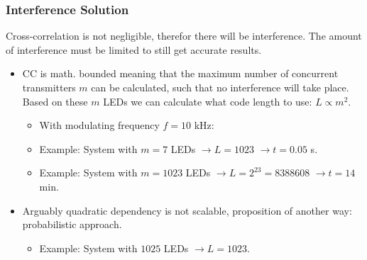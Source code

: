 \documentclass{beamer}
\begin{document}
	\begin{frame}\frametitle{Interference Solution}

		Cross-correlation is not negligible, therefor there will be interference. The amount of interference must be limited to still get accurate results.

		\begin{itemize}

			\item CC is math. bounded meaning that the maximum number of concurrent transmitters $m$ can be calculated, such that no interference will take place. Based on these $m$ LEDs we can calculate what code length to use: $L \propto m^2$.

			\begin{itemize}
				\item With modulating frequency $f = 10$ kHz:
				\item Example: System with $m = 7$ LEDs $\rightarrow L = 1023$ $\rightarrow t = 0.05$ s.
				\item Example: System with $m = 1023$ LEDs $\rightarrow L = 2^{23} = 8388608$ $\rightarrow t = 14$ min.
			\end{itemize}

			\item Arguably quadratic dependency is not scalable, proposition of another way: probabilistic approach.
			\begin{itemize}
				\item Example: System with $1025$ LEDs $\rightarrow L = 1023$.
			\end{itemize}

		\end{itemize}


	\end{frame}
\end{document}
